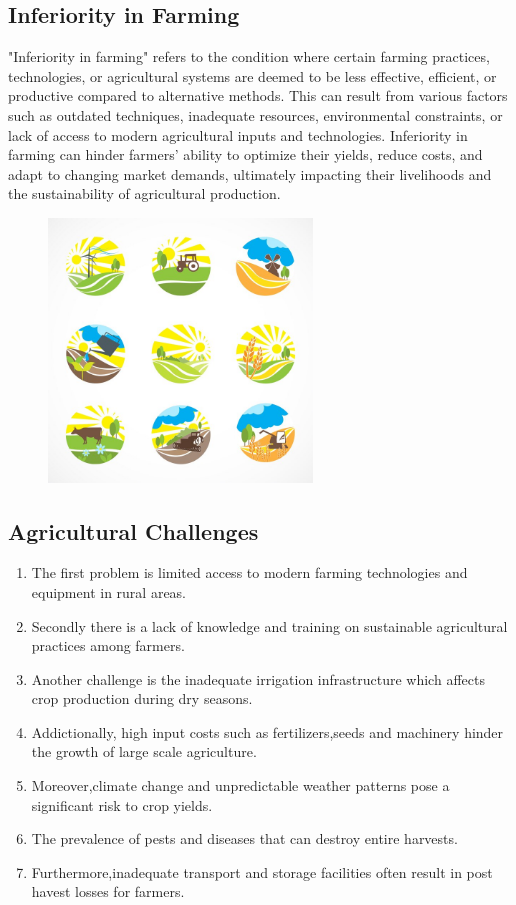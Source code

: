 \documentclass{article}
\begin{document}
\subsection{Inferiority in Farming}
"Inferiority in farming" refers to the condition where certain farming practices, technologies, or agricultural systems are deemed to be less effective, efficient, or productive compared to alternative methods. This can result from various factors such as outdated techniques, inadequate resources, environmental constraints, or lack of access to modern agricultural inputs and technologies. Inferiority in farming can hinder farmers' ability to optimize their yields, reduce costs, and adapt to changing market demands, ultimately impacting their livelihoods and the sustainability of agricultural production.
\begin{figure}[th]
    \centering
    \includegraphics[width=7cm]{nine-farm-scenes_1284-748.jpg}
    \label{fig:enter-label}
\end{figure}
\newpage
\subsection{Agricultural Challenges}
\begin{enumerate}
    \item The first problem is limited access to modern farming technologies and equipment in rural areas.
\item Secondly there is a lack of knowledge and training on sustainable agricultural practices among farmers.
\item Another challenge is the inadequate irrigation infrastructure which affects crop production during dry seasons.
\item Addictionally, high input costs such as fertilizers,seeds and machinery hinder the growth of large scale agriculture.
\item Moreover,climate change and unpredictable weather patterns pose a significant risk to crop yields.
\item The prevalence of pests and diseases that can destroy entire harvests.
\item Furthermore,inadequate transport and storage facilities often result in post havest losses for farmers.
\end{enumerate}
\end{document}
